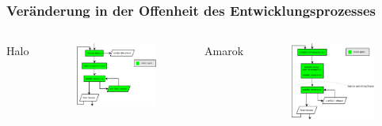 \documentclass{beamer}
\begin{document}
\begin{frame}
\frametitle{Ver\"anderung in der Offenheit des Entwicklungsprozesses}
\begin{columns}[t]
   \begin{center}Halo\end{center}
   \begin{figure}[h!]
    \centering
    \includegraphics[scale=0.3,keepaspectratio=true]{./ReleaseProcessHaloNew.png}
   \end{figure}
   \begin{center}Amarok\end{center}
   \begin{figure}[h!]
    \centering
    \includegraphics[scale=0.3,keepaspectratio=true]{./ReleaseProcessAmarokNew.png}
   \end{figure}
\end{columns}
\end{frame}
\end{document}
